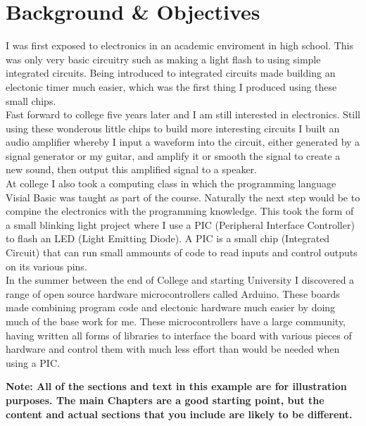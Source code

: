 \chapter{Background \& Objectives}

I was first exposed to electronics in an academic enviroment in high school.  This was only very basic circuitry such as making a light flash to using simple integrated circuits.  Being introduced to integrated circuits made building an electonic timer much easier, which was the first thing I produced using these small chips.
\\Fast forward to college five years later and I am still interested in electronics.  Still using these wonderous little chips to build more interesting circuits I built an audio amplifier whereby I input a waveform into the circuit, either generated by a signal generator or my guitar, and amplify it or smooth the signal to create a new sound, then output this amplified signal to a speaker.
\\At college I also took a computing class in which the programming language Visial Basic was taught as part of the course.  Naturally the next step would be to compine the electronics with the programming knowledge.  This took the form of a small blinking light project where I use a PIC (Peripheral Interface Controller) to flash an LED (Light Emitting Diode).  A PIC is a small chip (Integrated Circuit) that can run small ammounts of code to read inputs and control outputs on its various pins.
\\In the summer between the end of College and starting University I discovered a range of open source hardware microcontrollers called Arduino.  These boards made combining program code and electonic hardware much easier by doing much of the base work for me.  These microcontrollers have a large community, having written all forms of libraries to interface the board with various pieces of hardware and control them with much less effort than would be needed when using a PIC.


\textbf{Note: All of the sections and text in this example are for illustration purposes. The main Chapters are a good starting point, but the content and actual sections that you include are likely to be different.}
